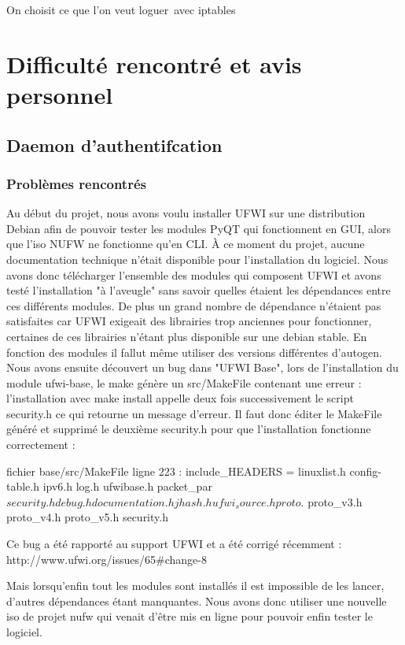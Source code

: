 \documentclass[12pt]{report}
\begin{document}
\begin{itemize}
On choisit ce que l’on veut loguer avec iptables

\chapter{Difficulté rencontré et avis personnel}
\section{Daemon d'authentifcation}
\subsection{Problèmes rencontrés}
Au début du projet, nous avons voulu installer UFWI sur une distribution Debian afin de pouvoir tester les modules PyQT qui fonctionnent en GUI,
alors que l'iso NUFW ne fonctionne qu'en CLI.
À ce moment du projet, aucune documentation technique n'était disponible pour l'installation du logiciel.
Nous avons donc télécharger l'ensemble des modules qui composent UFWI et avons testé l'installation "à l'aveugle" sans savoir quelles étaient les 
dépendances entre ces différents modules.
De plus un grand nombre de dépendance n'étaient pas satisfaites car UFWI exigeait des librairies trop anciennes pour fonctionner, 
certaines de ces librairies n'étant plus disponible sur une debian stable.
En fonction des modules il fallut même utiliser des versions différentes d'autogen.
Nous avons ensuite découvert un bug dans "UFWI Base", 
lors de l'installation du module ufwi-base, le make génère un src/MakeFile contenant une erreur : 
l'installation avec make install appelle deux fois successivement le script security.h ce qui retourne un message d'erreur. 
Il faut donc éditer le MakeFile généré et supprimé le deuxième security.h pour que l'installation fonctionne correctement :

fichier base/src/MakeFile
ligne 223 :
include_HEADERS = linuxlist.h config-table.h ipv6.h log.h ufwibase.h packet_par$
security.h debug.h documentation.h jhash.h ufwi_source.h proto.$
proto_v3.h proto_v4.h proto_v5.h security.h

Ce bug a été rapporté au support UFWI et a été corrigé récemment : http://www.ufwi.org/issues/65#change-8

Mais lorsqu'enfin tout les modules sont installés il est impossible de les lancer, d'autres dépendances étant manquantes.
Nous avons donc utiliser une nouvelle iso de projet nufw qui venait d'être mis en ligne pour pouvoir enfin tester le logiciel.



\end{itemize}
\end{document}

